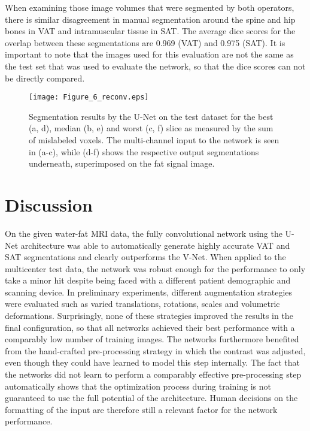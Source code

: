 \documentclass[10pt,letterpaper]{article}
\begin{document}
	When examining those image volumes that were segmented by both operators, there is similar disagreement in manual segmentation around the spine and hip bones in VAT and intramuscular tissue in SAT. The average dice scores for the overlap between these segmentations are 0.969 (VAT) and 0.975 (SAT). It is important to note that the images used for this evaluation are not the same as the test set that was used to evaluate the network, so that the dice scores can not be directly compared.

	\begin{figure}[H] %


		\texttt{[image: Figure\_6\_reconv.eps]}

		\caption{Segmentation results by the U-Net on the test dataset for the best (a, d), median (b, e) and worst (c, f) slice as measured by the sum of mislabeled voxels. The multi-channel input to the network is seen in (a-c), while (d-f) shows the respective output segmentations underneath, superimposed on the fat signal image.}

		\label{fig6} %

	\end{figure}


	\section*{Discussion}

	On the given water-fat MRI data, the fully convolutional network using the U-Net architecture was able to automatically generate highly accurate VAT and SAT segmentations and clearly outperforms the V-Net. When applied to the multicenter test data, the network was robust enough for the performance to only take a minor hit despite being faced with a different patient demographic and scanning device.
	In preliminary experiments, different augmentation strategies were evaluated such as varied translations, rotations, scales and volumetric deformations. Surprisingly, none of these strategies improved the results in the final configuration, so that all networks achieved their best performance with a comparably low number of training images. The networks furthermore benefited from the hand-crafted pre-processing strategy in which the contrast was adjusted, even though they could have learned to model this step internally. The fact that the networks did not learn to perform a comparably effective pre-processing step automatically shows that the optimization process during training is not guaranteed to use the full potential of the architecture. Human decisions on the formatting of the input are therefore still a relevant factor for the network performance. \\
\end{document}
